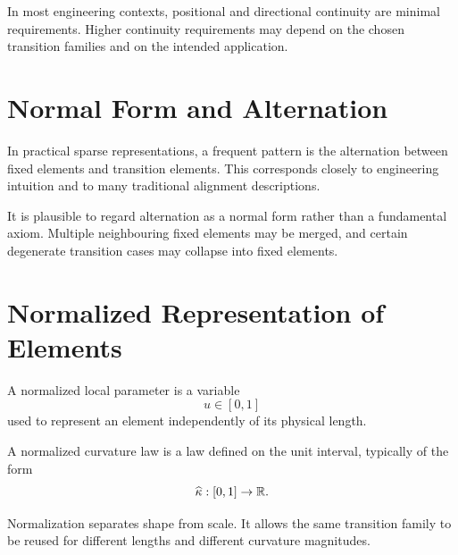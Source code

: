 In most engineering contexts, positional and directional continuity are
minimal requirements. Higher continuity requirements may depend on the
chosen transition families and on the intended application.


\section{Normal Form and Alternation}

In practical sparse representations, a frequent pattern is the
alternation between fixed elements and transition elements. This
corresponds closely to engineering intuition and to many traditional
alignment descriptions.


It is plausible to regard alternation as a normal form rather than a
fundamental axiom. Multiple neighbouring fixed elements may be merged,
and certain degenerate transition cases may collapse into fixed
elements.

\section{Normalized Representation of Elements}

\begin{definition}
A normalized local parameter is a variable
\[
u\in[0,1]
\]
used to represent an element independently of its physical length.
\end{definition}

\begin{definition}
A normalized curvature law is a law defined on the unit interval,
typically of the form
\[
\widehat{\kappa} : [0,1]\to\mathbb{R}.
\]
\end{definition}

Normalization separates shape from scale.
It allows the same transition family to be reused for different lengths
and different curvature magnitudes.

